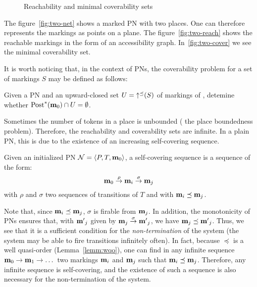 \begin{figure}[htbp]
  \label{fig:reach-and-cover-example}
  \centering
  \subfloat[A \ac{PN} ($|P| = 2$)]{
    \label{fig:two-net}
    

  }

  \qquad
  \caption{Reachability and minimal coverability sets}
\end{figure}

The figure~\ref{fig:two-net} shows a marked \ac{PN} with two places.
One can therefore represents the markings as points on a plane.
The figure~\ref{fig:two-reach} shows the reachable markings in the form of an accessibility graph.
In~\ref{fig:two-cover} we see the minimal coverability set.

It is worth noticing that, in the context of \acp{PN}, the coverability problem for a set of markings $S$ may be defined as follows:
\begin{defi}
  \label{defi:upclocovprblm}
  Given a \ac{PN} \N and an upward-closed set $U = \operatorname{\uparrow^\preceq}(S)$ of markings of \N, detemine whether $\operatorname{Post}^*(\mathbf{m}_0) \cap U = \emptyset$.
\end{defi}

Sometimes the number of tokens in a place is unbounded ( the place boundedness problem).
Therefore, the reachability and coverability sets are infinite.
In a plain \ac{PN}, this is due to the existence of an increasing self-covering sequence.
\begin{defi}
  Given an initialized \ac{PN} $\mathcal{N} = \langle P,T, \mathbf{m}_0\rangle$,
  a self-covering sequence is a sequence of the form:
  \[
    \mathbf{m}_0 \stackrel{\rho}{\to} \mathbf{m}_i \stackrel{\sigma}{\to} \mathbf{m}_j
  \]
  with $\rho$ and $\sigma$ two sequences of transitions of $T$
  and with $\mathbf{m}_i \preceq \mathbf{m}_j$.
\end{defi}

Note that, since $\mathbf{m}_i \preceq \mathbf{m}_j$, $\sigma$ is firable from $\mathbf{m}_j$.
In addition, the monotonicity of \acp{PN} ensures that, with $\mathbf{m'}_j$ given by $\mathbf{m}_j \stackrel{\sigma}{\to} \mathbf{m'}_j$, we have $\mathbf{m}_j \preceq \mathbf{m'}_j$.
Thus, we see that it is a sufficient condition for the \emph{non-termination} of the system (the system may be able to fire transitions infinitely often).
In fact, because $\preceq$ is a well quasi-order (Lemma~\ref{lemm:wqo}), one can find in any infinite sequence $\mathbf{m}_0 \stackrel{}{\to} \mathbf{m}_1 \stackrel{}{\to} \dots$ two markings $\mathbf{m}_i$ and $\mathbf{m}_j$ such that $\mathbf{m}_i \preceq \mathbf{m}_j$.
Therefore, any infinite sequence is self-covering, and the existence of such a sequence is also necessary for the non-termination of the system.

